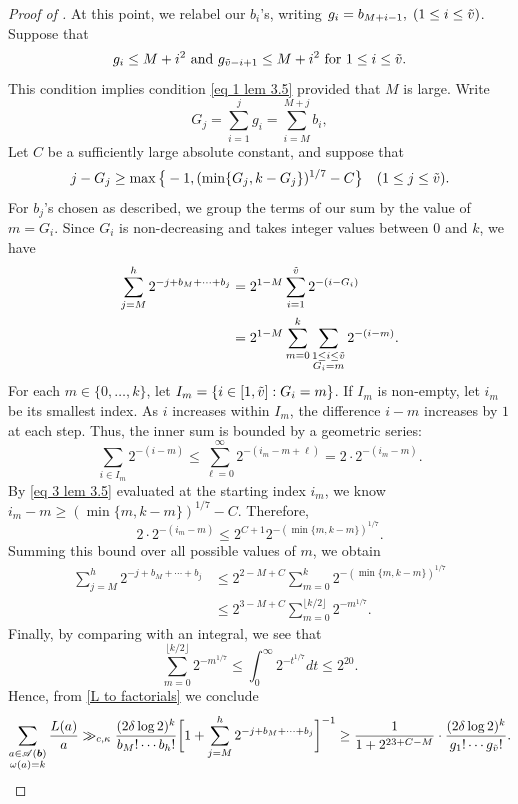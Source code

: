 \documentclass[10pt,a4paper]{amsart}
\newcommand{\density}{\delta}
\begin{document}
\begin{proof}[Proof of ]
	At this point, we relabel our $b_i$'s, writing $g_i = b_{M+i-1},\;(1 \leq i \leq \Tilde{v})$. Suppose that 
	\begin{equation}\label{eq 2 lem 3.5}
		g_i \leq M+i^2\text{ and } g_{\Tilde{v}-i+1} \leq M+i^2 \text{ for } 1 \leq i \leq \Tilde{v}.
	\end{equation}
	This condition implies condition \eqref{eq 1 lem 3.5} provided that $M$ is large. Write $$G_j = \sum_{i = 1}^j g_i = \sum_{i = M}^{M+j}b_i,$$ Let $C$ be a sufficiently large absolute constant, and suppose that
	\begin{equation}\label{eq 3 lem 3.5}
		j - G_j \geq \max \big\{-1,(\min\{G_j,k-G_j\})^{1/7}-C\big\} \quad (1 \leq j \leq \Tilde{v}).
	\end{equation}
	For $b_j$'s chosen as described, we group the terms of our sum by the value of $m = G_i$. Since $G_i$ is non-decreasing and takes integer values between $0$ and $k$, we have
	\begin{align*}
		\sum_{j =M}^h 2^{-j +b_M+\cdots +b_j} &= 2^{1-M}\sum_{i=1}^{\Tilde{v}} 2^{-(i -G_{i})} \\
		&= 2^{1-M} \sum_{m=0}^k \sum_{\substack{1 \leq i \leq \Tilde{v} \\ G_i = m}} 2^{-(i-m)}.
	\end{align*}
	For each $m \in \{0, \dots, k\}$, let $I_m = \{i \in [1,\Tilde{v}] : G_i = m\}$. If $I_m$ is non-empty, let $i_m$ be its smallest index. As $i$ increases within $I_m$, the difference $i-m$ increases by $1$ at each step. Thus, the inner sum is bounded by a geometric series:
	$$ \sum_{i \in I_m} 2^{-(i-m)} \leq \sum_{\ell = 0}^\infty 2^{-(i_m - m + \ell)} = 2 \cdot 2^{-(i_m - m)}. $$
	By \eqref{eq 3 lem 3.5} evaluated at the starting index $i_m$, we know $i_m - m \geq (\min\{m,k-m\})^{1/7} - C$. Therefore,
	$$ 2 \cdot 2^{-(i_m - m)} \leq 2^{C+1} 2^{-(\min\{m,k-m\})^{1/7}}. $$
	Summing this bound over all possible values of $m$, we obtain
	\begin{align*}
		\sum_{j =M}^h 2^{-j +b_M+\cdots +b_j} &\leq 2^{2-M+C} \sum_{m=0}^k 2^{-(\min\{m,k-m\})^{1/7}} \\
		&\leq 2^{3-M+C} \sum_{m=0}^{\lfloor k/2 \rfloor} 2^{-m^{1/7}}.
	\end{align*}
	Finally, by comparing with an integral, we see that 
	$$\sum_{m=0}^{\lfloor k/2 \rfloor} 2^{-m^{1/7}} \leq \int_0^\infty 2^{-t^{1/7}}dt \leq 2^{20}.$$
	Hence, from \eqref{L to factorials} we conclude
	\begin{equation*}
		\sum_{\substack{a \in \mathscr{A}(\bm{b}) \\ \omega(a) = k}} \frac{L(a)}{a} \gg_{c,\kappa}  \frac{(2 \density \log 2)^k}{b_M! \cdots b_h!} \bigg[ 1 + \sum_{j =M}^h 2^{-j +b_M + \cdots +b_j} \bigg]^{-1} \ge \frac{1}{1+2^{23+C-M}} \cdot \frac{(2 \density \log 2)^k}{g_1! \cdots g_{\Tilde{v}}!}.

\end{equation*}
\end{proof}
\end{document}
